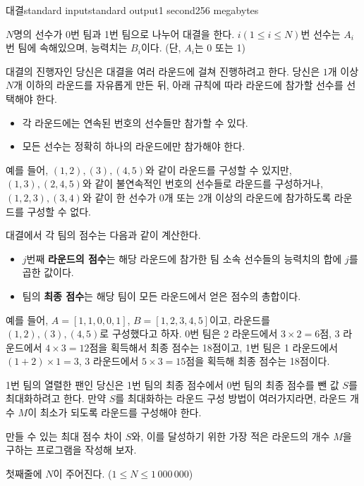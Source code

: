\begin{problem}{대결}{standard input}{standard output}{1 second}{256 megabytes}

$N$명의 선수가 0번 팀과 1번 팀으로 나누어 대결을 한다. $i(1 \le i \le N)$번 선수는 $A_i$번 팀에 속해있으며, 능력치는 $B_i$이다. (단, $A_i$는 0 또는 1)

대결의 진행자인 당신은 대결을 여러 라운드에 걸쳐 진행하려고 한다. 당신은 $1$개 이상 $N$개 이하의 라운드를 자유롭게 만든 뒤, 아래 규칙에 따라 라운드에 참가할 선수를 선택해야 한다.

\begin{itemize}
    \item 각 라운드에는 연속된 번호의 선수들만 참가할 수 있다.
    \item 모든 선수는 정확히 하나의 라운드에만 참가해야 한다.
\end{itemize}

예를 들어, $(1, 2), (3), (4, 5)$와 같이 라운드를 구성할 수 있지만, $(1, 3), (2, 4, 5)$와 같이 불연속적인 번호의 선수들로 라운드를 구성하거나, $(1, 2, 3), (3, 4)$와 같이 한 선수가 0개 또는 2개 이상의 라운드에 참가하도록 라운드를 구성할 수 없다.

대결에서 각 팀의 점수는 다음과 같이 계산한다.

\begin{itemize}
    \item $j$번째 \textbf{라운드의 점수}는 해당 라운드에 참가한 팀 소속 선수들의 능력치의 합에 $j$를 곱한 값이다.
    \item 팀의 \textbf{최종 점수}는 해당 팀이 모든 라운드에서 얻은 점수의 총합이다.
\end{itemize}

예를 들어, $A = [1, 1, 0, 0, 1]$, $B = [1, 2, 3, 4, 5]$이고, 라운드를 $(1, 2), (3), (4, 5)$로 구성했다고 하자. 0번 팀은 2 라운드에서 $3 \times 2 = 6$점, 3 라운드에서 $4 \times 3 = 12$점을 획득해서 최종 점수는 18점이고, 1번 팀은 1 라운드에서 $(1+2) \times 1 = 3$, 3 라운드에서 $5 \times 3 = 15$점을 획득해 최종 점수는 18점이다.

1번 팀의 열렬한 팬인 당신은 1번 팀의 최종 점수에서 0번 팀의 최종 점수를 뺀 값 $S$를 최대화하려고 한다. 만약 $S$를 최대화하는 라운드 구성 방법이 여러가지라면, 라운드 개수 $M$이 최소가 되도록 라운드를 구성해야 한다.

만들 수 있는 최대 점수 차이 $S$와, 이를 달성하기 위한 가장 적은 라운드의 개수 $M$을 구하는 프로그램을 작성해 보자.

\InputFile
첫째줄에 $N$이 주어진다. ($1 \le N \le 1\,000\,000$)


\end{problem}
